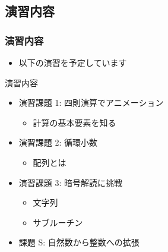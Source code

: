 \subsection{演習内容}
\begin{frame}
\frametitle{演習内容}
  \begin{itemize}
\item 以下の演習を予定しています
  \end{itemize}
  \begin{block}{演習内容}
    \begin{itemize}
\item 演習課題 1: 四則演算でアニメーション
      \begin{itemize}
\item 計算の基本要素を知る
      \end{itemize}
\item 演習課題 2: 循環小数
      \begin{itemize}
\item 配列とは
      \end{itemize}
\item 演習課題 3: 暗号解読に挑戦
      \begin{itemize}
\item 文字列
\item サブルーチン
      \end{itemize}
\item 課題 S: 自然数から整数への拡張
    \end{itemize}
  \end{block}
\end{frame}
